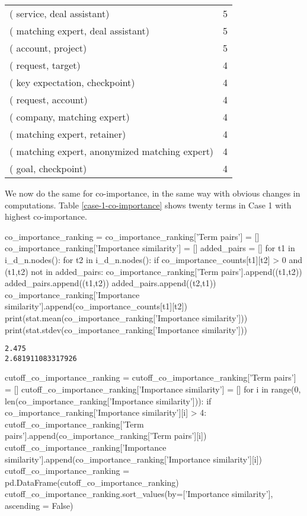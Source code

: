 \begin{longtable}{@{}ll@{}}
( service, deal assistant)                     & 5                      \\
( matching expert, deal assistant)             & 5                      \\
( account, project)                            & 5                      \\
( request, target)                             & 4                      \\
( key expectation, checkpoint)                 & 4                      \\
( request, account)                            & 4                      \\
( company, matching expert)                    & 4                      \\
( matching expert, retainer)                   & 4                      \\
( matching expert, anonymized matching expert) & 4                      \\
( goal, checkpoint)                            & 4                      \\* \bottomrule
\end{longtable}

We now do the same for co-importance, in the same way with obvious changes in computations. Table \ref{case-1-co-importance} shows twenty terms in Case 1 with highest co-importance.

\begin{pycode}
co_importance_ranking = {}
co_importance_ranking['Term pairs'] = []
co_importance_ranking['Importance similarity'] = []
added_pairs = []
for t1 in i_d_n.nodes():
    for t2 in i_d_n.nodes():
        if co_importance_counts[t1][t2] > 0 and (t1,t2) not in added_pairs:
                co_importance_ranking['Term pairs'].append((t1,t2))
                added_pairs.append((t1,t2))
                added_pairs.append((t2,t1))
                co_importance_ranking['Importance similarity'].append(co_importance_counts[t1][t2])
print(stat.mean(co_importance_ranking['Importance similarity']))
print(stat.stdev(co_importance_ranking['Importance similarity']))
\end{pycode}

\begin{lstlisting}[breaklines]
2.475
2.681911083317926
\end{lstlisting}

\begin{pycode}
cutoff_co_importance_ranking = {}
cutoff_co_importance_ranking['Term pairs'] = []
cutoff_co_importance_ranking['Importance similarity'] = []
for i in range(0, len(co_importance_ranking['Importance similarity'])):
    if co_importance_ranking['Importance similarity'][i] > 4:
            cutoff_co_importance_ranking['Term pairs'].append(co_importance_ranking['Term pairs'][i])
            cutoff_co_importance_ranking['Importance similarity'].append(co_importance_ranking['Importance similarity'][i]) 
cutoff_co_importance_ranking = pd.DataFrame(cutoff_co_importance_ranking)
cutoff_co_importance_ranking.sort_values(by=['Importance similarity'], ascending = False)  
\end{pycode}


